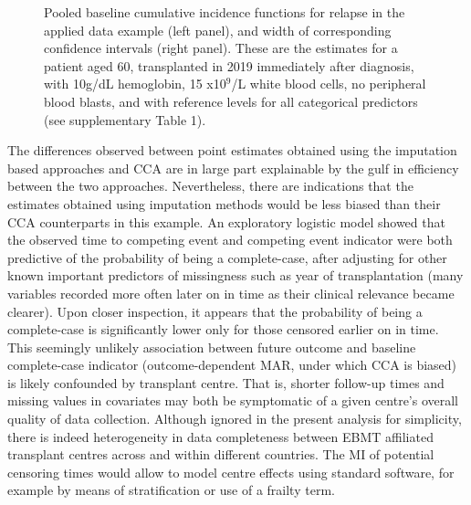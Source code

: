 \documentclass[
  letterpaper,
  paper=240mm:170mm,
  twoside=true,
  open=right,
  fontsize=10pt,
  pagesize=false,
  BCOR=15mm,
  DIV=14,
  headinclude=true,
  footinclude=false,
  headsepline=on]{scrbook}
\begin{document}
\begin{figure}


\caption{\label{fig-applied-base-cuminc}Pooled baseline cumulative
incidence functions for relapse in the applied data example (left
panel), and width of corresponding confidence intervals (right panel).
These are the estimates for a patient aged 60, transplanted in 2019
immediately after diagnosis, with 10g/dL hemoglobin, 15 x10\(^9\)/L
white blood cells, no peripheral blood blasts, and with reference levels
for all categorical predictors (see supplementary Table 1).}

\end{figure}%

The differences observed between point estimates obtained using the
imputation based approaches and CCA are in large part explainable by the
gulf in efficiency between the two approaches. Nevertheless, there are
indications that the estimates obtained using imputation methods would
be less biased than their CCA counterparts in this example. An
exploratory logistic model showed that the observed time to competing
event and competing event indicator were both predictive of the
probability of being a complete-case, after adjusting for other known
important predictors of missingness such as year of transplantation
(many variables recorded more often later on in time as their clinical
relevance became clearer). Upon closer inspection, it appears that the
probability of being a complete-case is significantly lower only for
those censored earlier on in time. This seemingly unlikely association
between future outcome and baseline complete-case indicator
(outcome-dependent MAR, under which CCA is biased) is likely confounded
by transplant centre. That is, shorter follow-up times and missing
values in covariates may both be symptomatic of a given centre's overall
quality of data collection. Although ignored in the present analysis for
simplicity, there is indeed heterogeneity in data completeness between
EBMT affiliated transplant centres across and within different
countries. The MI of potential censoring times would allow to model
centre effects using standard software, for example by means of
stratification or use of a frailty term.
\end{document}
